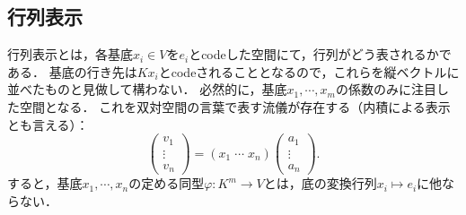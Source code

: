 \documentclass[uplatex, dvipdfmx]{jsreport}
\begin{document}
\subsection{行列表示}

\begin{tcolorbox}[colframe=ForestGreen, colback=ForestGreen!10!white, breakable,
    title=行列表示]
    行列表示とは，各基底$x_i\in V$を$e_i$とcodeした空間にて，行列がどう表されるかである．
    基底の行き先は$Kx_i$とcodeされることとなるので，これらを縦ベクトルに並べたものと見做して構わない．
    必然的に，基底$x_1,\cdots,x_m$の係数のみに注目した空間となる．
    これを双対空間の言葉で表す流儀が存在する（内積による表示とも言える）：
    \[\begin{pmatrix}v_1\\\vdots\\v_n\end{pmatrix}=(x_1\;\cdots\;x_n)\begin{pmatrix}a_1\\\vdots\\a_n\end{pmatrix}.\]
    すると，基底$x_1,\cdots,x_n$の定める同型$\varphi:K^m\to V$とは，底の変換行列$x_i\mapsto e_i$に他ならない．
\end{tcolorbox}
\end{document}
